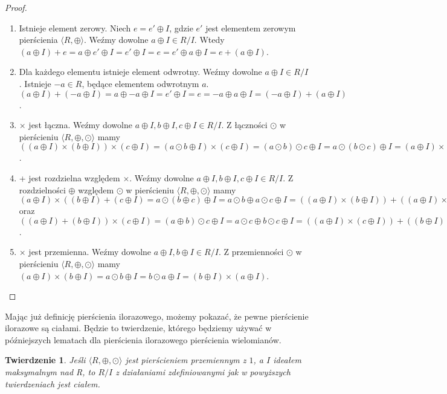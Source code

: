 \documentclass[declaration,shortabstract]{iithesis}
\theoremstyle{definition}
\theoremstyle{remark} \newtheorem{observation}{Obserwacja}
\theoremstyle{plain} \newtheorem{theorem}{Twierdzenie}
\theoremstyle{plain} \newtheorem{lemma}{Lemat}
\theoremstyle{remark} \newtheorem*{remark*}{Uwaga}
\theoremstyle{reminder} \newtheorem*{reminder*}{Przypomnienie}
\begin{document}
\begin{proof}
\begin{enumerate}[resume,label=(\arabic*),leftmargin=.4in]
\begin{enumerate}[label=(3.\arabic*)]
		      	\item Istnieje element zerowy. Niech $e = e' \oplus I$, gdzie $e'$ jest elementem zerowym pierścienia $\langle R, \oplus \rangle$. Weźmy dowolne $a \oplus I \in R/I$. Wtedy $(a \oplus I) + e = a \oplus e' \oplus I = e' \oplus I = e = e' \oplus a \oplus I = e + (a \oplus I)$.
		      	\item Dla każdego elementu istnieje element odwrotny. Weźmy dowolne $a \oplus I \in R/I$. Istnieje $-a \in R$, będące elementem odwrotnym $a$. $(a \oplus I) + (-a \oplus I) = a \oplus -a \oplus I = e' \oplus I = e = -a \oplus a \oplus I = (-a \oplus I) + (a \oplus I)$.
		      	\item $\times$ jest łączna. Weźmy dowolne $a \oplus I, b \oplus I, c \oplus I \in R/I$. Z łączności $\odot$ w pierścieniu $\langle R, \oplus, \odot \rangle$ mamy $((a \oplus I) \times (b \oplus I)) \times (c \oplus I) = (a \odot b \oplus I) \times (c \oplus I) = (a \odot b) \odot c \oplus I = a \odot (b \odot c) \oplus I = (a \oplus I) \times (b \odot c \oplus I) = (a \oplus I) \times ((b \oplus I) \times (c \oplus I))$.
		      	\item + jest rozdzielna względem $\times$. Weźmy dowolne $a \oplus I, b \oplus I, c \oplus I \in R/I$. Z rozdzielności $\oplus$ względem $\odot$ w pierścieniu $\langle R, \oplus, \odot \rangle$ mamy $(a \oplus I) \times ((b \oplus I) + (c \oplus I) = a \odot (b \oplus c) \oplus I = a \odot b \oplus a \odot c \oplus I = ((a \oplus I) \times (b \oplus I)) + ((a \oplus I) \times (c \oplus I)))$ oraz $((a \oplus I) + (b \oplus I)) \times (c \oplus I) = (a \oplus b) \odot c \oplus I = a \odot c \oplus b \odot c \oplus I = ((a \oplus I) \times (c \oplus I)) + ((b \oplus I) \times (c \oplus I))$.
		      	\item $\times$ jest przemienna. Weźmy dowolne $a \oplus I, b \oplus I \in R/I$. Z przemienności $\odot$ w pierścieniu $\langle R, \oplus, \odot \rangle$ mamy $(a \oplus I) \times (b \oplus I) = a \odot b \oplus I = b \odot a \oplus I = (b \oplus I) \times (a \oplus I)$.
		      \end{enumerate}
	\end{enumerate}
\end{proof}

Mając już definicję pierścienia ilorazowego, możemy pokazać, że pewne pierścienie ilorazowe są ciałami. Będzie to twierdzenie, którego będziemy używać w późniejszych lematach dla pierścienia ilorazowego pierścienia wielomianów.

\theoremstyle{theorem}
\begin{theorem}\label{pier_ilo_cialem0}
	Jeśli $\langle R, \oplus, \odot \rangle$ jest pierścieniem przemiennym z $1$, a $I$ ideałem maksymalnym nad R, to $R/I$ z działaniami zdefiniowanymi jak w powyższych twierdzeniach jest ciałem.
\end{theorem}
\end{document}
